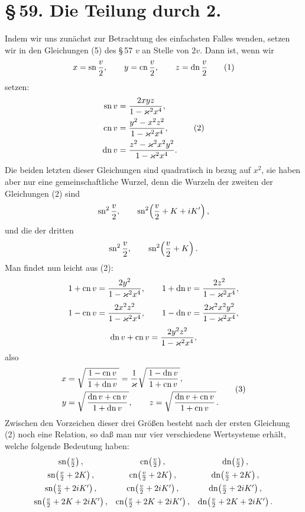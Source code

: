 \documentclass[11pt]{article}
\providecommand{\sn}{\operatorname{sn}}
\providecommand{\cn}{\operatorname{cn}}
\providecommand{\dn}{\operatorname{dn}}
\begin{document}
\section*{\S\,59. Die Teilung durch 2.}

Indem wir uns zunächst zur Betrachtung des einfachsten Falles wenden, setzen wir in den
Gleichungen (5) des \S\,57 $v$ an Stelle von $2v$. Dann ist, wenn wir
\begin{equation}
x=\sn {v\over2},\qquad y=\cn {v\over2},\qquad z=\dn {v\over2}
\tag{1}
\end{equation}
setzen:
\begin{equation}
\begin{aligned}
\sn v&={2xyz\over1-\varkappa^2x^4},\\
\cn v&={y^2-x^2z^2\over1-\varkappa^2x^4},\\
\dn v&={z^2-\varkappa^2x^2y^2\over1-\varkappa^2x^4}.
\end{aligned}
\tag{2}
\end{equation}
Die beiden letzten dieser Gleichungen sind quadratisch in bezug auf $x^2$, sie haben aber
nur eine gemeinschaftliche Wurzel, denn die Wurzeln der zweiten der Gleichungen (2) sind
\[
\sn^2{v\over2},\qquad \sn^2\!\left({v\over2}+K+iK'\right),
\]
und die der dritten
\[
\sn^2{v\over2},\qquad \sn^2\!\left({v\over2}+K\right).
\]
Man findet nun leicht aus (2):
\[
1+\cn v={2y^2\over1-\varkappa^2x^4},\qquad
1+\dn v={2z^2\over1-\varkappa^2x^4},
\]
\[
1-\cn v={2x^2z^2\over1-\varkappa^2x^4},\qquad
1-\dn v={2\varkappa^2x^2y^2\over1-\varkappa^2x^4},
\]
\[
\dn v+\cn v={2y^2z^2\over1-\varkappa^2x^4},
\]
also
\begin{equation}
\begin{aligned}
x&=\sqrt{\,{1-\cn v\over1+\dn v}\,}
={1\over\varkappa}\sqrt{\,{1-\dn v\over1+\cn v}\,},\\
y&=\sqrt{\,{\dn v+\cn v\over1+\dn v}\,},
\qquad
z=\sqrt{\,{\dn v+\cn v\over1+\cn v}\,}.
\end{aligned}
\tag{3}
\end{equation}
Zwischen den Vorzeichen dieser drei Größen besteht nach der ersten Gleichung (2) noch eine
Relation, so daß man nur vier verschiedene Wertsysteme erhält, welche folgende Bedeutung
haben:
\[
\begin{array}{ccc}
\sn\!\left({v\over2}\right),&\cn\!\left({v\over2}\right),&\dn\!\left({v\over2}\right),\\[0.4em]
\sn\!\left({v\over2}+2K\right),&\cn\!\left({v\over2}+2K\right),&\dn\!\left({v\over2}+2K\right),\\[0.4em]
\sn\!\left({v\over2}+2iK'\right),&\cn\!\left({v\over2}+2iK'\right),&\dn\!\left({v\over2}+2iK'\right),\\[0.4em]
\sn\!\left({v\over2}+2K+2iK'\right),&
\cn\!\left({v\over2}+2K+2iK'\right),&
\dn\!\left({v\over2}+2K+2iK'\right).
\end{array}
\]
\end{document}
